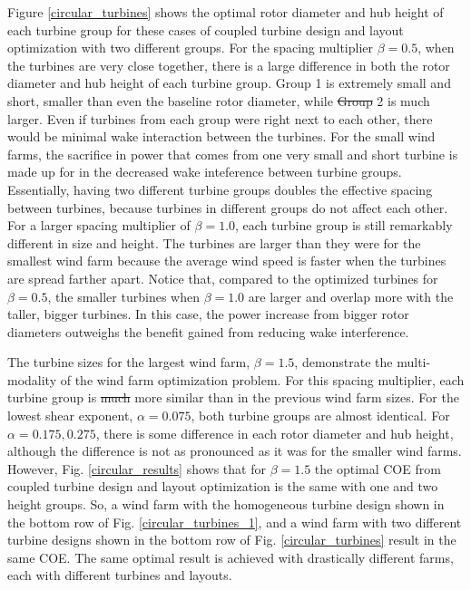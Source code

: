 \documentclass[wes, manuscript]{copernicus}
\providecommand{\DIFadd}[1]{{\protect\color{blue}\uwave{#1}}} %
\providecommand{\DIFdel}[1]{{\protect\color{red}\sout{#1}}}                      %
\providecommand{\DIFaddbegin}{} %
\providecommand{\DIFaddend}{} %
\providecommand{\DIFdelbegin}{} %
\providecommand{\DIFdelend}{} %
\begin{document}
Figure \ref{circular_turbines} shows the optimal rotor diameter and hub height of each turbine group for these cases of coupled turbine design and layout optimization with two different groups. For the spacing multiplier $\beta=0.5$, when the turbines are very close together, there is a large difference in both the rotor diameter and hub height of each turbine group. Group 1 is extremely small and short, smaller than even the baseline rotor diameter, while \DIFdelbegin \DIFdel{Group }\DIFdelend \DIFaddbegin \DIFadd{group }\DIFaddend 2 is much larger. Even if turbines from each group were right next to each other, there would be minimal wake interaction between the turbines. For the small wind farms, the sacrifice in power that comes from one very small and short turbine is made up for in the decreased wake inteference between turbine groups. Essentially, having two different turbine groups doubles the effective spacing between turbines, because turbines in different groups do not affect each other. For a larger spacing multiplier of $\beta=1.0$, each turbine group is still remarkably different in size and height. The turbines are larger than they were for the smallest wind farm because the average wind speed is faster when the turbines are spread farther apart. Notice that, compared to the optimized turbines for $\beta=0.5$, the smaller turbines when $\beta=1.0$ are larger and overlap more with the taller, bigger turbines. In this case, the power increase from bigger rotor diameters outweighs the benefit gained from reducing wake interference. 

The turbine sizes for the largest wind farm, $\beta=1.5$, demonstrate the multi-modality of the wind farm optimization problem. For this spacing multiplier, each turbine group is \DIFdelbegin \DIFdel{much }\DIFdelend more similar than in the previous wind farm sizes. For the lowest shear exponent, $\alpha=0.075$, both turbine groups are almost identical. For $\alpha=0.175,0.275$, there is some difference in each rotor diameter and hub height, although the difference is not as pronounced as it was for the smaller wind farms. However, Fig. \ref{circular_results} shows that for $\beta=1.5$ the optimal COE from coupled turbine design and layout optimization is the same with one and two height groups. So, a wind farm with the homogeneous turbine design shown in the bottom row of Fig. \ref{circular_turbines_1}, and a wind farm with two different turbine designs shown in the bottom row of Fig. \ref{circular_turbines} result in the same COE. The same optimal result is achieved with drastically different farms, each with different turbines and layouts.  
\end{document}
